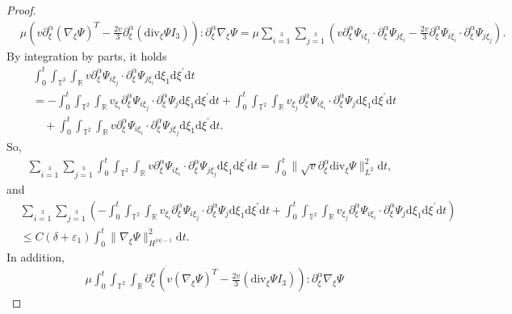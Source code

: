 \documentclass[10pt,a4paper]{amsart}
\newcommand{\ddiv}{\mathrm{div}}
\newcommand{\dif}{\mathrm{d}}
\begin{document}
\begin{proof}
\begin{align*}
	&{\mu}\left(v\partial_\xi^\alpha\left(\nabla_\xi\Psi\right)^T
	-\frac{2v}{3}\partial_\xi^\alpha\left(\ddiv_\xi\Psi I_3\right)\right):\partial_\xi^\alpha\nabla_\xi\Psi
	=
	\mu\sum\limits_{i=1}\limits^3\sum\limits_{j=1}\limits^3
	\left(
	v \partial_\xi^\alpha\Psi_{i\xi_j}\cdot\partial_\xi^\alpha\Psi_{j\xi_i}
	-\frac{2v}{3} \partial_\xi^\alpha\Psi_{i\xi_i}\cdot\partial_\xi^\alpha\Psi_{j\xi_j}
	\right).
\end{align*}
By integration by parts, it holds
\begin{align*}
	&\int_0^t\int_{\mathbb{T}^2}\int_{\mathbb{R}}v \partial_\xi^\alpha\Psi_{i\xi_j}\cdot\partial_\xi^\alpha\Psi_{j\xi_i}
	\dif \xi_1\dif \xi^{\prime}\dif t\\
	&=
	-\int_0^t\int_{\mathbb{T}^2}\int_{\mathbb{R}}v_{\xi_i} \partial_\xi^\alpha\Psi_{i\xi_j}\cdot\partial_\xi^\alpha\Psi_{j}
	\dif \xi_1\dif \xi^{\prime}\dif t
	+\int_0^t\int_{\mathbb{T}^2}\int_{\mathbb{R}}v_{\xi_j} \partial_\xi^\alpha\Psi_{i\xi_i}\cdot\partial_\xi^\alpha\Psi_{j}
	\dif \xi_1\dif \xi^{\prime}\dif t\\
	&\quad+\int_0^t\int_{\mathbb{T}^2}\int_{\mathbb{R}}v \partial_\xi^\alpha\Psi_{i\xi_i}\cdot\partial_\xi^\alpha\Psi_{j\xi_j}
	\dif \xi_1\dif \xi^{\prime}\dif t.
\end{align*}
So,
\begin{align*}
	\sum\limits_{i=1}\limits^3\sum\limits_{j=1}\limits^3
	\int_0^t\int_{\mathbb{T}^2}\int_{\mathbb{R}}v \partial_\xi^\alpha\Psi_{i\xi_i}\cdot\partial_\xi^\alpha\Psi_{j\xi_j}
	\dif \xi_1\dif \xi^{\prime}\dif t
	=\int_0^t
	\|\sqrt{v} \partial_\xi^\alpha\ddiv_\xi\Psi\|_{L^2}^2
	\dif t
	,
\end{align*}
and
	\begin{align*}
		&\sum\limits_{i=1}\limits^3\sum\limits_{j=1}\limits^3
		\left(-\int_0^t\int_{\mathbb{T}^2}\int_{\mathbb{R}}v_{\xi_i} \partial_\xi^\alpha\Psi_{i\xi_j}\cdot\partial_\xi^\alpha\Psi_{j}
		\dif \xi_1\dif \xi^{\prime}\dif t
		+\int_0^t\int_{\mathbb{T}^2}\int_{\mathbb{R}}v_{\xi_j} \partial_\xi^\alpha\Psi_{i\xi_i}\cdot\partial_\xi^\alpha\Psi_{j}
		\dif \xi_1\dif \xi^{\prime}\dif t\right)\\
		&\le C(\delta+\varepsilon_1)
		\int_0^t \|\nabla_\xi\Psi\|^2_{H^{|\alpha|-1}}
		\dif t
		.
	\end{align*}
In addition,
	\begin{align*}
		&\mu\int_0^t\int_{\mathbb{T}^2}\int_{\mathbb{R}}
		\partial_\xi^\alpha\left(v\left(\nabla_\xi\Psi\right)^T
		-\frac{2v}{3}\left(\ddiv_\xi\Psi I_3\right)\right):\partial_\xi^\alpha\nabla_\xi\Psi

\end{align*}
\end{proof}
\end{document}
